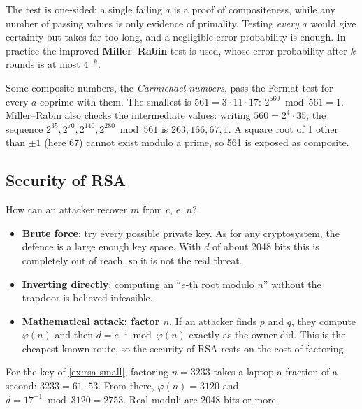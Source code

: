The test is one-sided: a single failing $a$ is a proof of compositeness, while any number of passing values is only evidence of primality. Testing \emph{every} $a$ would give certainty but takes far too long, and a negligible error probability is enough. In practice the improved \textbf{Miller--Rabin} test is used, whose error probability after $k$ rounds is at most $4^{-k}$.

\begin{remark}
Some composite numbers, the \emph{Carmichael numbers}, pass the Fermat test for every $a$ coprime with them. The smallest is $561 = 3 \cdot 11 \cdot 17$: $2^{560} \bmod 561 = 1$. Miller--Rabin also checks the intermediate values: writing $560 = 2^4 \cdot 35$, the sequence $2^{35}, 2^{70}, 2^{140}, 2^{280} \bmod 561$ is $263, 166, 67, 1$. A square root of 1 other than $\pm 1$ (here 67) cannot exist modulo a prime, so 561 is exposed as composite.
\end{remark}

\subsection{Security of RSA}

How can an attacker recover $m$ from $c$, $e$, $n$?
\begin{itemize}
    \item \textbf{Brute force}: try every possible private key. As for any cryptosystem, the defence is a large enough key space. With $d$ of about 2048 bits this is completely out of reach, so it is not the real threat.
    \item \textbf{Inverting directly}: computing an \enquote{$e$-th root modulo $n$} without the trapdoor is believed infeasible.
    \item \textbf{Mathematical attack: factor $n$}. If an attacker finds $p$ and $q$, they compute $\varphi(n)$ and then $d = e^{-1} \bmod \varphi(n)$ exactly as the owner did. This is the cheapest known route, so the security of RSA rests on the cost of factoring.
\end{itemize}

\begin{example}
For the key of \cref{ex:rsa-small}, factoring $n = 3233$ takes a laptop a fraction of a second: $3233 = 61 \cdot 53$. From there, $\varphi(n) = 3120$ and $d = 17^{-1} \bmod 3120 = 2753$. Real moduli are 2048 bits or more.
\end{example}

